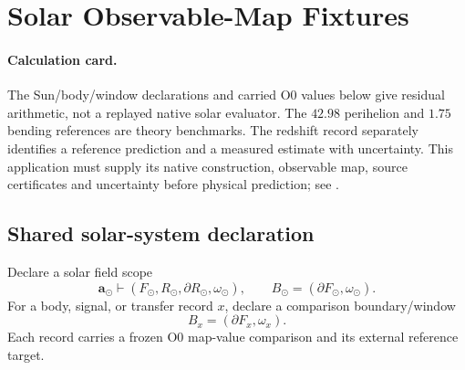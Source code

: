 
\section{Solar Observable-Map Fixtures}\label{manual:solar-system-field-tests}

\paragraph{Calculation card.}
The Sun/body/window declarations and carried O0 values below give residual
arithmetic, not a replayed native solar evaluator. The \(42.98\) perihelion
and \(1.75\) bending references are theory benchmarks. The redshift record
separately identifies a reference prediction and a measured estimate with
uncertainty. This application must supply its native construction, observable
map, source certificates and uncertainty before physical prediction; see
.



\subsection{Shared solar-system declaration}\label{manual:solar:shared}
Declare a solar field scope
\[
\mathbf a_\odot\vdash(F_\odot,R_\odot,\partial R_\odot,\omega_\odot),
\qquad
B_\odot=(\partial F_\odot,\omega_\odot).
\]
For a body, signal, or transfer record $x$, declare a comparison boundary/window
\[
B_x=(\partial F_x,\omega_x).
\]
Each record carries a frozen O0 map-value comparison and its external reference target.

